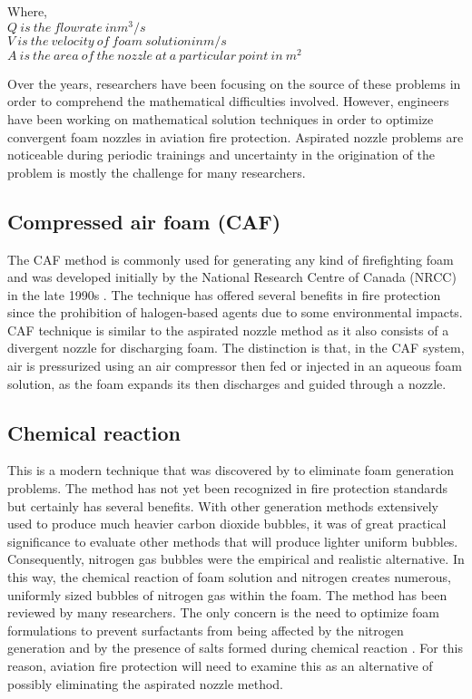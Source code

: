 \begin{doublespace}
    Where, \\
    $Q\ is\ the\ flowrate\ in m^3/s$ \\
    $V\ is\ the\ velocity\ of\ foam\ solution in m/s$ \\
    $A\ is\ the\ area\ of\ the\ nozzle\ at\ a\ particular\ point\ in\ m^2$ \\
\end{doublespace}

Over the years, researchers have been focusing on the source of these problems in order to comprehend the mathematical difficulties involved. However, engineers have been working on mathematical solution techniques in order to optimize convergent foam nozzles in aviation fire protection. Aspirated nozzle problems are noticeable during periodic trainings and uncertainty in the origination of the problem is mostly the challenge for many researchers.

\subsection{Compressed air foam (CAF)}
The CAF method is commonly used for generating any kind of firefighting foam and was developed initially by the National Research Centre of Canada (NRCC) in the late 1990s \cite{rie2016class}. The technique has offered several benefits in fire protection since the prohibition of halogen-based agents due to some environmental impacts.  
CAF technique is similar to the aspirated nozzle method as it also consists of a divergent nozzle for discharging foam. The distinction is that, in the CAF system, air is pressurized using an air compressor then fed or injected in an aqueous foam solution, as the foam expands its then discharges and guided through a nozzle.

\subsection{Chemical reaction}
This is a modern technique that was discovered by \cite{laundess2012suppression} to eliminate foam generation problems. The method has not yet been recognized in fire protection standards but certainly has several benefits. With other generation methods extensively used to produce much heavier carbon dioxide bubbles, it was of great practical significance to evaluate other methods that will produce lighter uniform bubbles. Consequently, nitrogen gas bubbles were the empirical and realistic alternative. In this way, the chemical reaction of foam solution and nitrogen creates numerous, uniformly sized bubbles of nitrogen gas within the foam.
The method has been reviewed by many researchers.  The only concern is the need to optimize foam formulations to prevent surfactants from being affected by the nitrogen generation and by the presence of salts formed during chemical reaction \cite{laundess2012suppression}.  For this reason, aviation fire protection will need to examine this as an alternative of possibly eliminating the aspirated nozzle method.

